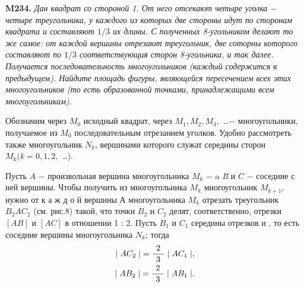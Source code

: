 \newpage
\setcounter{page}{40}
\begin{minipage}[t]{0.48\linewidth}

\noindent\textbf{M234.} \emph{Дан квадрат со стороной 1. От него отсекают четыре уголка $-$ четыре треугольника, у каждого из которых две стороны идут по сторонам квадрата и составляют $1/3$ их длины. С полученных 8-угольником делают то же самое: от каждой вершины отрезают треугольник, две соторны которого составляют по $1/3$ соответствующия сторон 8-угольника, и так далее. Получается последовательность многоугольников (каждый содержится в предыдущем). Найдите площадь фигуры, являющейся пересечением всех этих многоугольников (то есть образованной точками, принадлежащими всем многоугольникам).}

\bigskip

\setlength{\parindent}{7ex}Обозначим через $M_0$ исходный квадрат, через \hspace{2mm}$M_1, M_2, M_3,$ \ldots $-$ многоугольники, получаемое из $M_0$ последовательным отрезанием уголков. Удобно рассмотреть также многоугольник $N_k$, вершинами которого служат середины сторон $M_k (k =  0, 1, 2,$ \ldots).

Пусть $A$ \hspace{0.5mm}$-$ \hspace{1mm}произвольная вершина многоугольника $M_k$ \hspace{1mm}$-$ a \textit{B} и $C$ \hspace{1mm}$-$ соседние с ней вершины. Чтобы получить из многоугольника $M_k$ многоугольник $M_{k + 1}$, нужно от \hspace{2mm}к а ж д о й \hspace{2mm}вершины А многоугольника $M_k$ отрезать треугольник $B_2AC_2$ (см. рис.8) такой, что точки $B_2$ и $C_2$ делят, соответственно, отрезки $[AB]$ и $[AC]$ в отношении 1 : 2. Пусть $B_1$ и $C_1$ середины отрезков и , то есть соседние вершины многоугольника $N_k$; тогда
\begin{align}
    |\hspace{1mm}AC_2\hspace{1mm}| = \frac{\hspace{1.5mm}2\hspace{1.5mm}}{3}\hspace{1mm}|\hspace{1mm}AC_1\hspace{1mm}|, \\
    |\hspace{1mm}AB_2\hspace{1mm}| = \frac{\hspace{1.5mm}2\hspace{1.5mm}}{3}\hspace{1mm}|\hspace{1mm}AB_1\hspace{1mm}|. \nonumber
\end{align}


\end{minipage}
